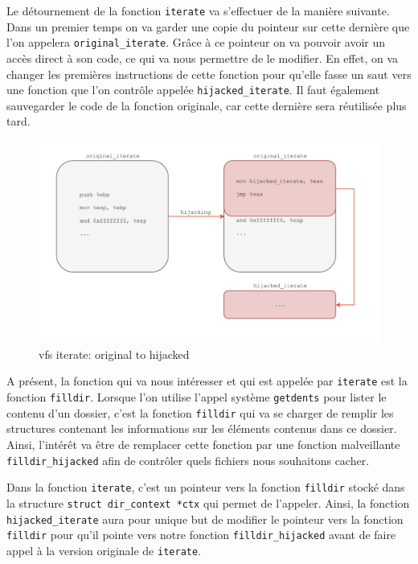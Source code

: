 \documentclass[12pt]{article}
\begin{document}
        Le détournement de la fonction \texttt{iterate} va s'effectuer de la manière suivante. Dans un premier temps on va garder une copie du pointeur sur cette dernière que l'on appelera \texttt{original\_iterate}. Grâce à ce pointeur on va pouvoir avoir un accès direct à son code, ce qui va nous permettre de le modifier. En effet, on va changer les premières instructions de cette fonction pour qu'elle fasse un saut vers une fonction que l'on contrôle appelée \texttt{hijacked\_iterate}. Il faut également sauvegarder le code de la fonction originale, car cette dernière sera réutilisée plus tard. \\

\begin{figure}[H] 
\begin{center}
\includegraphics[scale=0.4]{./img/vfs_iterate_original_to_hijacked.png}

\caption[dsfsdf]{vfs iterate: original to hijacked}
\end{center}
\end{figure}

        A présent, la fonction qui va nous intéresser et qui est appelée par \texttt{iterate} est la fonction \texttt{filldir}. Lorsque l'on utilise l'appel système \texttt{getdents} pour lister le contenu d'un dossier, c'est la fonction \texttt{filldir} qui va se charger de remplir les structures contenant les informations sur les éléments contenus dans ce dossier. Ainsi, l'intérêt va être de remplacer cette fonction par une fonction malveillante \texttt{filldir\_hijacked} afin de contrôler quels fichiers nous souhaitons cacher.

        Dans la fonction \texttt{iterate}, c'est un pointeur vers la fonction \texttt{filldir} stocké dans la structure \texttt{struct dir\_context *ctx} qui permet de l'appeler. Ainsi, la fonction \texttt{hijacked\_iterate} aura pour unique but de modifier le pointeur vers la fonction \texttt{filldir} pour qu'il pointe vers notre fonction \texttt{filldir\_hijacked} avant de faire appel à la version originale de \texttt{iterate}.\\
\end{document}
